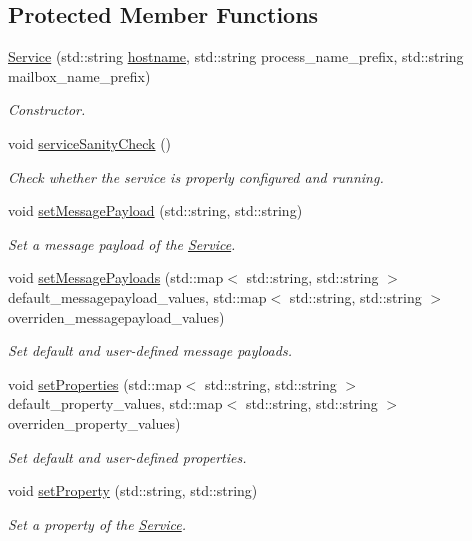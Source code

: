 \subsection*{Protected Member Functions}
\begin{DoxyCompactItemize}
\item 
\hyperlink{classwrench_1_1_service_a405ee888a74f503d9d99ef87964dc814}{Service} (std\+::string \hyperlink{classwrench_1_1_s4_u___daemon_a52bc0b9a6cd248310749dac086819f00}{hostname}, std\+::string process\+\_\+name\+\_\+prefix, std\+::string mailbox\+\_\+name\+\_\+prefix)
\begin{DoxyCompactList}\small\item\em Constructor. \end{DoxyCompactList}\item 
void \hyperlink{classwrench_1_1_service_a573315b3c2f328e1e26cd74371140f4a}{service\+Sanity\+Check} ()
\begin{DoxyCompactList}\small\item\em Check whether the service is properly configured and running. \end{DoxyCompactList}\item 
void \hyperlink{classwrench_1_1_service_ae1d174ad9e50cd3d7cc2cf2863a2bb65}{set\+Message\+Payload} (std\+::string, std\+::string)
\begin{DoxyCompactList}\small\item\em Set a message payload of the \hyperlink{classwrench_1_1_service}{Service}. \end{DoxyCompactList}\item 
void \hyperlink{classwrench_1_1_service_a9ec41132539247584c2878c6dc18f34e}{set\+Message\+Payloads} (std\+::map$<$ std\+::string, std\+::string $>$ default\+\_\+messagepayload\+\_\+values, std\+::map$<$ std\+::string, std\+::string $>$ overriden\+\_\+messagepayload\+\_\+values)
\begin{DoxyCompactList}\small\item\em Set default and user-\/defined message payloads. \end{DoxyCompactList}\item 
void \hyperlink{classwrench_1_1_service_ac42e376453c0f471b4826dd732fc14c5}{set\+Properties} (std\+::map$<$ std\+::string, std\+::string $>$ default\+\_\+property\+\_\+values, std\+::map$<$ std\+::string, std\+::string $>$ overriden\+\_\+property\+\_\+values)
\begin{DoxyCompactList}\small\item\em Set default and user-\/defined properties. \end{DoxyCompactList}\item 
void \hyperlink{classwrench_1_1_service_a0b05fdef3ddb499a537d55f046a396d7}{set\+Property} (std\+::string, std\+::string)
\begin{DoxyCompactList}\small\item\em Set a property of the \hyperlink{classwrench_1_1_service}{Service}. \end{DoxyCompactList}\end{DoxyCompactItemize}

